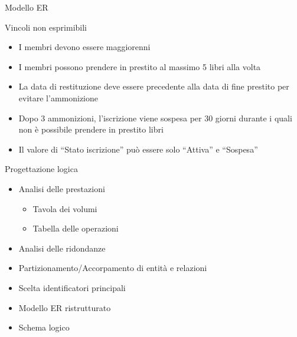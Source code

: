 \begin{frame}{Modello ER}
\begin{center}
    \end{center}
\end{frame}

\begin{frame}{Vincoli non esprimibili}
    \begin{itemize}
        \item I membri devono essere maggiorenni
        \item I membri possono prendere in prestito al massimo 5 libri alla volta
        \item La data di restituzione deve essere precedente alla data di fine prestito per evitare l'ammonizione
        \item Dopo 3 ammonizioni, l'iscrizione viene sospesa per 30 giorni durante i quali non è possibile prendere in prestito libri
        \item Il valore di ``Stato iscrizione'' può essere solo ``Attiva'' e ``Sospesa''
    \end{itemize}
\end{frame}

\begin{frame}{Progettazione logica}
    \begin{itemize}
        \item Analisi delle prestazioni
            \begin{itemize}
                \item Tavola dei volumi
                \item Tabella delle operazioni
            \end{itemize}
        \item Analisi delle ridondanze
        \item Partizionamento/Accorpamento di entità e relazioni
        \item Scelta identificatori principali
        \item Modello ER ristrutturato
        \item Schema logico
    \end{itemize}
\end{frame}

